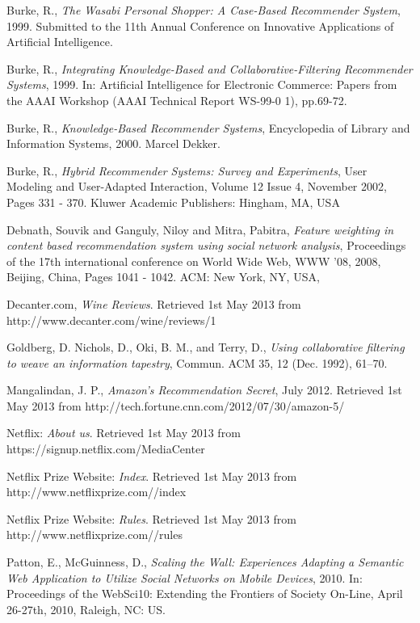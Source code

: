 \begin{thebibliography}{9}

     Burke, R., \emph{The Wasabi Personal Shopper: A Case-Based Recommender System}, 1999. Submitted to the 11th Annual Conference on Innovative Applications of Artificial Intelligence.

     Burke, R., \emph{Integrating Knowledge-Based and Collaborative-Filtering Recommender Systems}, 1999. In: Artificial Intelligence for Electronic Commerce: Papers from the AAAI Workshop (AAAI Technical Report WS-99-0 1), pp.69-72.

     Burke, R., \emph{Knowledge-Based Recommender Systems}, Encyclopedia of Library and Information Systems, 2000. Marcel Dekker.

     Burke, R., \emph{Hybrid Recommender Systems: Survey and Experiments}, User Modeling and User-Adapted Interaction, Volume 12 Issue 4, November 2002, Pages 331 - 370. Kluwer Academic Publishers: Hingham, MA, USA

     Debnath, Souvik and Ganguly, Niloy and Mitra, Pabitra, \emph{
        Feature weighting in content based recommendation system using social network analysis}, Proceedings of the 17th international conference on World Wide Web, WWW '08, 2008, Beijing, China, Pages 1041 - 1042. ACM: New York, NY, USA,

     Decanter.com, \emph{Wine Reviews}. Retrieved 1st May 2013 from http://www.decanter.com/wine/reviews/1

     Goldberg, D. Nichols, D., Oki, B. M., and Terry, D., \emph{Using collaborative filtering to weave an information tapestry}, Commun. ACM 35, 12 (Dec. 1992), 61--70.

     Mangalindan, J. P., \emph{Amazon's Recommendation Secret}, July 2012. Retrieved 1st May 2013 from http://tech.fortune.cnn.com/2012/07/30/amazon-5/

     Netflix: \emph{About us}. Retrieved 1st May 2013 from https://signup.netflix.com/MediaCenter

     Netflix Prize Website: \emph{Index}.  Retrieved 1st May 2013 from http://www.netflixprize.com//index

     Netflix Prize Website: \emph{Rules}.  Retrieved 1st May 2013 from http://www.netflixprize.com//rules

     Patton, E., McGuinness, D., \emph{Scaling the Wall: Experiences Adapting a Semantic Web Application to Utilize Social Networks on Mobile Devices}, 2010. In: Proceedings of the WebSci10: Extending the Frontiers of Society On-Line, April 26-27th, 2010, Raleigh, NC: US.


\end{thebibliography}
